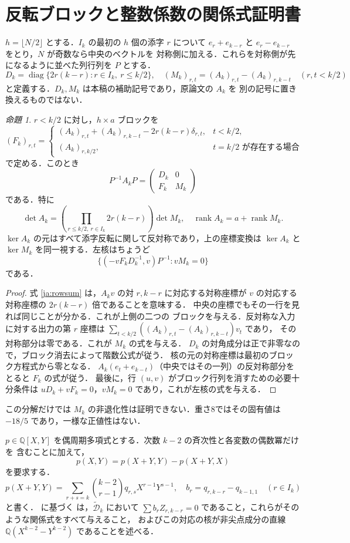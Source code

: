 \documentclass[12pt]{amsart}
\theoremstyle{definition}
\theoremstyle{remark}
\numberwithin{equation}{section}
\newcommand{\rank}{\operatorname{rank}}
\newcommand{\Q}{\mathbb{Q}}
\newcommand{\Dtilde}{\widetilde{\mathcal D}_k}
\newtheorem{jprop}[thm]{命題}
\theoremstyle{definition}
\theoremstyle{remark}
\begin{document}
\section{反転ブロックと整数係数の関係式証明書}
$h=\lfloor N/2\rfloor$ とする．$I_k$ の最初の $h$ 個の添字 $r$ について
$e_r+e_{k-r}$ と $e_r-e_{k-r}$ をとり，$N$ が奇数なら中央のベクトルを
対称側に加える．これらを対称側が先になるように並べた列行列を $P$ とする．
\[
 D_k=\operatorname{diag}\{2r(k-r):r\in I_k,\ r\leq k/2\},
 \quad (M_k)_{r,t}=(A_k)_{r,t}-(A_k)_{r,k-t}\quad(r,t<k/2)
\]
と定義する．$D_k,M_k$ は本稿の補助記号であり，原論文の $A_k$ を
別の記号に置き換えるものではない．
\begin{jprop}\label{ja:block}
$r<k/2$ に対し，$h\times a$ ブロックを
\[
 (F_k)_{r,t}=\begin{cases}
 (A_k)_{r,t}+(A_k)_{r,k-t}-2r(k-r)\delta_{r,t},&t<k/2,\\
 (A_k)_{r,k/2},&t=k/2\text{ が存在する場合}
 \end{cases}
\]
で定める．このとき
\[
 P^{-1}A_kP=\begin{pmatrix}D_k&0\\F_k&M_k\end{pmatrix}
\]
である．特に
\[
 \det A_k=\left(\prod_{r\leq k/2,\ r\in I_k}2r(k-r)\right)\det M_k,
 \quad \rank A_k=a+\rank M_k.
\]
$\ker A_k$ の元はすべて添字反転に関して反対称であり，上の座標変換は
$\ker A_k$ と $\ker M_k$ を同一視する．左核はちょうど
\[
 \{(-vF_kD_k^{-1},v)P^{-1}:vM_k=0\}
\]
である．
\end{jprop}
\begin{proof}
式 \eqref{ja:rowsum} は，$A_kv$ の対 $r,k-r$ に対応する対称座標が
$v$ の対応する対称座標の $2r(k-r)$ 倍であることを意味する．
中央の座標でもその一行を見れば同じことが分かる．これが上側の二つの
ブロックを与える．反対称な入力に対する出力の第 $r$ 座標は
$\sum_{t<k/2}((A_k)_{r,t}-(A_k)_{r,k-t})v_t$ であり，
その対称部分は零である．これが $M_k$ の式を与える．
$D_k$ の対角成分は正で非零なので，ブロック消去によって階数公式が従う．
核の元の対称座標は最初のブロック方程式から零となる．
$A_k(e_t+e_{k-t})$（中央ではその一列）の反対称部分をとると $F_k$ の式が従う．
最後に，行 $(u,v)$ がブロック行列を消すための必要十分条件は
$uD_k+vF_k=0$，$vM_k=0$ であり，これが左核の式を与える．
\end{proof}
この分解だけでは $M_k$ の非退化性は証明できない．重さ8ではその固有値は
$-18/5$ であり，一様な正値性はない．

$p\in\Q[X,Y]$ を偶周期多項式とする．次数 $k-2$ の斉次性と各変数の偶数冪だけを
含むことに加えて，
\[
 p(X,Y)=p(X+Y,Y)-p(X+Y,X)
\]
を要求する．
\[
 p(X+Y,Y)=\sum_{r+s=k}\binom{k-2}{r-1}q_{r,s}X^{r-1}Y^{s-1},
 \quad b_r=q_{r,k-r}-q_{k-1,1}\quad(r\in I_k)
\]
と書く．\cite[Theorem 3]{jGKZ} に基づく
\cite[Proposition 5.3]{jBR} は，$\Dtilde$ において
$\sum b_rZ_{r,k-r}=0$ であること，これらがそのような関係式をすべて与えること，
およびこの対応の核が非尖点成分の直線 $\Q(X^{k-2}-Y^{k-2})$ であることを述べる．
\end{document}
